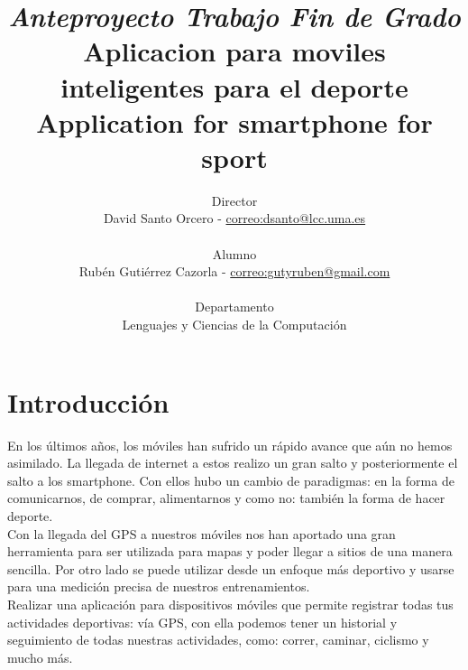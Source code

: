 \documentclass[a4paper, 11pt]{article}
\begin{document}
  \title{\emph{Anteproyecto Trabajo Fin de Grado} \\
   Aplicacion para moviles inteligentes para el deporte\\
   Application for smartphone for sport\\
  }
  \author{
   Director \\ David Santo Orcero - \url{correo:dsanto@lcc.uma.es} \\ \\
   Alumno \\ Rubén Gutiérrez Cazorla - \url{correo:gutyruben@gmail.com}\\ \\
   Departamento \\Lenguajes y Ciencias de la Computación
   }
  \maketitle


  \thispagestyle{empty}

%


\section{Introducción}

      En los últimos años, los móviles han sufrido un rápido avance que aún no hemos
      asimilado. La llegada de internet a estos realizo un gran salto y posteriormente
      el salto a los smartphone. Con ellos hubo un cambio de paradigmas: en la forma
      de comunicarnos, de comprar, alimentarnos y como no: también la forma de hacer
      deporte.\\

      Con la llegada del GPS a nuestros móviles nos han aportado una gran herramienta
      para ser utilizada para mapas y poder llegar a sitios de una manera sencilla.
      Por otro lado se puede utilizar desde un enfoque más deportivo y usarse para una
      medición precisa de nuestros entrenamientos.\\

      Realizar una aplicación para dispositivos móviles que permite registrar todas
      tus actividades deportivas: vía GPS, con ella podemos tener un historial y
      seguimiento de todas nuestras actividades, como: correr, caminar, ciclismo y
      mucho más.\\
\end{document}

